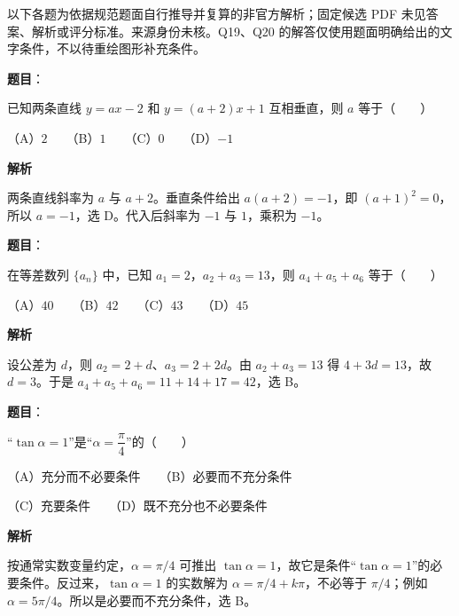 

\begin{gktip}
以下各题为依据规范题面自行推导并复算的非官方解析；固定候选 PDF 未见答案、解析或评分标准。来源身份未核。Q19、Q20 的解答仅使用题面明确给出的文字条件，不以待重绘图形补充条件。
\end{gktip}

\begin{answer}

\textbf{题目}：

已知两条直线 $y=ax-2$ 和 $y=(a+2)x+1$ 互相垂直，则 $a$ 等于\mbox{（　　）}

（A）$2$　　（B）$1$　　（C）$0$　　（D）$-1$

\textbf{解析}

两条直线斜率为 $a$ 与 $a+2$。垂直条件给出 $a(a+2)=-1$，即 $(a+1)^2=0$，所以 $a=-1$，选 D。代入后斜率为 $-1$ 与 $1$，乘积为 $-1$。


\end{answer}
\begin{answer}

\textbf{题目}：

在等差数列 $\{a_n\}$ 中，已知 $a_1=2$，$a_2+a_3=13$，则 $a_4+a_5+a_6$ 等于\mbox{（　　）}

（A）$40$　　（B）$42$　　（C）$43$　　（D）$45$

\textbf{解析}

设公差为 $d$，则 $a_2=2+d$、$a_3=2+2d$。由 $a_2+a_3=13$ 得 $4+3d=13$，故 $d=3$。于是 $a_4+a_5+a_6=11+14+17=42$，选 B。


\end{answer}
\begin{answer}

\textbf{题目}：

“$\tan\alpha=1$”是“$\alpha=\dfrac{\pi}{4}$”的\mbox{（　　）}

（A）充分而不必要条件　　（B）必要而不充分条件

（C）充要条件　　（D）既不充分也不必要条件

\textbf{解析}

按通常实数变量约定，$\alpha=\pi/4$ 可推出 $\tan\alpha=1$，故它是条件“$\tan\alpha=1$”的必要条件。反过来，$\tan\alpha=1$ 的实数解为 $\alpha=\pi/4+k\pi$，不必等于 $\pi/4$；例如 $\alpha=5\pi/4$。所以是必要而不充分条件，选 B。


\end{answer}
